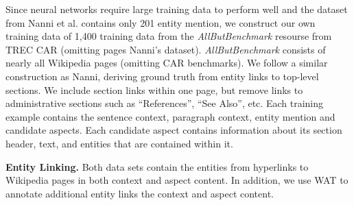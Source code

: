 Since neural networks require large training data to perform well and the dataset from Nanni et al. \cite{nanni2018entity} contains only 201 entity mention, we construct our own training data of 1,400 training data from the \textit{AllButBenchmark} resourse from TREC CAR (omitting pages Nanni's dataset). \textit{AllButBenchmark} consists of nearly all Wikipedia pages (omitting CAR benchmarks). We follow a similar construction as Nanni, deriving ground truth from entity links to top-level sections. We include section links within one page, but remove links to administrative sections such as ``References'', ``See Also'', etc. %
%
Each training example contains the sentence context, paragraph context, entity mention and candidate aspects. %
Each candidate aspect contains information about its section header, text, and entities that are contained within it.


\textbf{Entity Linking.} Both data sets contain the entities from hyperlinks to Wikipedia pages in both context and aspect content. In addition, we use WAT \cite{piccinno2014wat} to annotate additional entity links the context and aspect content.

    
    


